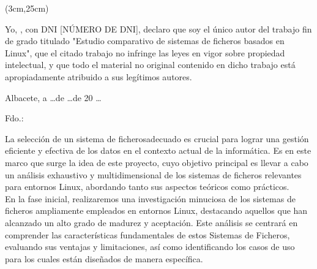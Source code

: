 \begin{textblock*}{\linewidth}(3cm,25cm) 
\begin{flushright}
{\fontsize{14pt}{4pt}\selectfont \fecha}
\end{flushright}
\end{textblock*}


\cleardoublepage
\thispagestyle{plain}
\begin{center}
\Large{}
\end{center}
\vskip1cm

Yo, \autor, con DNI [NÚMERO DE DNI], declaro que soy el único autor del trabajo fin de grado titulado "Estudio comparativo de sistemas de ficheros
basados en Linux", que el citado trabajo no infringe las leyes en vigor sobre propiedad intelectual, y que todo el material no original contenido en dicho trabajo está apropiadamente atribuido a sus legítimos autores.

\vspace*{2cm}
\begin{center}
Albacete, a \quad \ldots \quad de \quad \ldots \quad de 20 \ldots

\vskip3cm

Fdo.: \autor
\end{center}


\cleardoublepage
\thispagestyle{plain}
\begin{center}
\Large{}
\end{center}
\vskip1cm


La selección de un sistema de ficherosadecuado es crucial para lograr una gestión eficiente y efectiva de los datos en el contexto actual de la informática. Es en este marco que surge la idea de este proyecto, cuyo objetivo principal es llevar a cabo un análisis exhaustivo y multidimensional de los sistemas de ficheros relevantes para entornos Linux, abordando tanto sus aspectos teóricos como prácticos.\\

En la fase inicial, realizaremos una investigación minuciosa de los sistemas de ficheros ampliamente empleados en entornos Linux, destacando aquellos que han alcanzado un alto grado de madurez y aceptación. Este análisis se centrará en comprender las características fundamentales de estos Sistemas de Ficheros, evaluando sus ventajas y limitaciones, así como identificando los casos de uso para los cuales están diseñados de manera específica.\\


